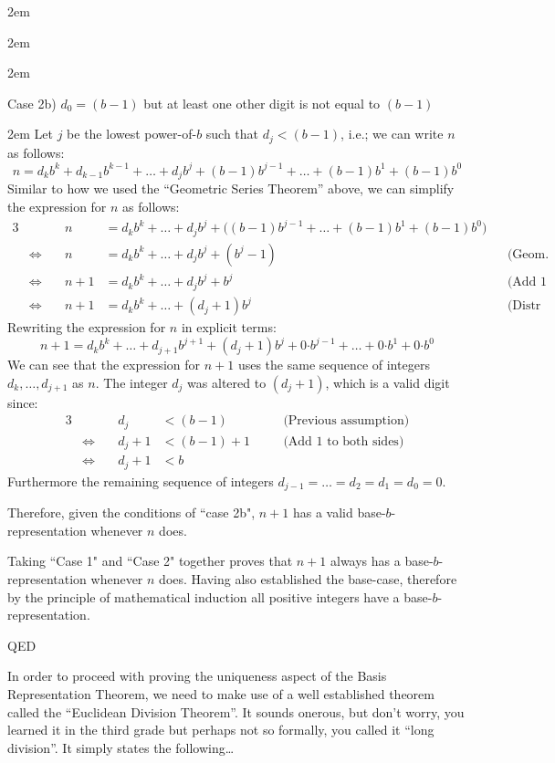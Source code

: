 \documentclass{article}
\newenvironment{jprIn}{\begin{adjustwidth}{2em}{}}{\end{adjustwidth}}
\begin{document}
\begin{jprIn}
\begin{jprIn}
\begin{jprIn}
\break
\end{jprIn}
Case 2b) $d_0=(b-1)$ but at least one other digit is not equal to $(b-1)$
\begin{jprIn}
Let $j$ be the lowest power-of-$b$ such that $d_j<(b{-}1)$,
i.e.; we can write $n$ as follows:
\[n = d_kb^k+d_{k-1}b^{k-1}+\dots+d_jb^j+(b{-}1)b^{j-1}+\dots+(b{-}1)b^1+(b{-}1)b^0\]
Similar to how we used the ``Geometric Series Theorem'' above,
we can simplify the expression for $n$ as follows:
{\small
\begin{alignat*}{3}
  &&n
  &= d_kb^k+\dots+d_jb^j+\big((b{-}1)b^{j-1}+\dots+(b{-}1)b^1+(b{-}1)b^0\big)&&\\
  &\Leftrightarrow\quad
  &n
  &= d_kb^k+\dots+d_jb^j+(b^j-1) &&\text{(Geom. Series Thm.)}\\
  &\Leftrightarrow\quad
  &n+1
  &=  d_kb^k+\dots+d_jb^j+b^j &&\text{(Add 1 to both sides)}\\
  &\Leftrightarrow\quad
  &n+1
  &=  d_kb^k+\dots+(d_j+1)b^j &&\text{(Distr Axiom)}
\end{alignat*}
}Rewriting the expression for $n$ in explicit terms:
\[n+1= d_kb^k+\dots+d_{j+1}b^{j+1}+(d_j+1)b^j+0{\cdot{}}{}b^{j-1}+\dots{}+0{\cdot{}}b^1+0{\cdot{}}b^0\]
We can see that the expression for $n+1$ uses the same
sequence of integers $d_k,\dots{},d_{j+1}$ as $n$.
The integer $d_j$ was altered to $(d_j{+}1)$, which is a valid digit since:
\begin{alignat*}{3}
  &&d_j
  &< (b-1) &&\quad\text{(Previous assumption)}\\
  &\Leftrightarrow\quad
  &d_j+1
  &< (b-1)+1 &&\quad\text{(Add 1 to both sides)}\\  
  &\Leftrightarrow\quad
  &d_j+1
  &< b
\end{alignat*}
Furthermore the remaining sequence of integers $d_{j-1}=\dots{}=d_2=d_1=d_0=0$.

Therefore, given the conditions of ``case 2b", $n+1$ has
a valid base-$b$-representation whenever $n$ does.
\end{jprIn}
\end{jprIn}
Taking ``Case 1" and ``Case 2" together proves that $n+1$
always has a base-$b$-representation whenever $n$ does.
Having also established the base-case, therefore by the principle of mathematical induction
all positive integers have a base-$b$-representation.

QED
\end{jprIn}

\bigskip
In order to proceed
with proving the uniqueness aspect of the Basis Representation Theorem, we
need to make use of a well established theorem
called the ``Euclidean Division Theorem''.
It sounds onerous, but don't worry, you learned it
in the third grade but perhaps not so formally, you called it ``long division''. It simply states the following\dots{}
\end{document}
